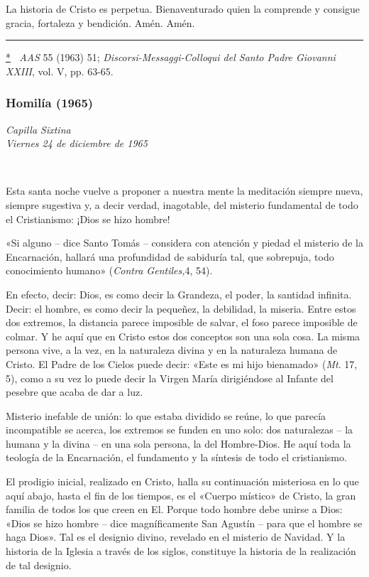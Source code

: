 La historia de Cristo es perpetua. Bienaventurado quien la comprende y
consigue gracia, fortaleza y bendición. Amén. Amén.

\begin{center}\rule{0.5\linewidth}{\linethickness}\end{center}

\protect\hyperlink{_ednrefux2a}{*}\emph{~ AAS} 55 (1963) 51;
\emph{Discorsi-Messaggi-Colloqui del Santo Padre Giovanni XXIII}, vol.
V, pp. 63-65.

\subsubsection{Homilía (1965)}
\emph{Capilla Sixtina\\
	Viernes 24 de diciembre de 1965}

~

Esta santa noche vuelve a proponer a nuestra mente la meditación siempre
nueva, siempre sugestiva y, a decir verdad, inagotable, del misterio
fundamental de todo el Cristianismo: ¡Dios se hizo hombre!

«Si alguno -- dice Santo Tomás -- considera con atención y piedad el
misterio de la Encarnación, hallará una profundidad de sabiduría tal,
que sobrepuja, todo conocimiento humano» (\emph{Contra Gentiles,}4, 54).

En efecto, decir: Dios, es como decir la Grandeza, el poder, la santidad
infinita. Decir: el hombre, es como decir la pequeñez, la debilidad, la
miseria. Entre estos dos extremos, la distancia parece imposible de
salvar, el foso parece imposible de colmar. Y he aquí que en Cristo
estos dos conceptos son una sola cosa. La misma persona vive, a la vez,
en la naturaleza divina y en la naturaleza humana de Cristo. El Padre de
los Cielos puede decir: «Este es mi hijo bienamado» (\emph{Mt}. 17, 5),
como a su vez lo puede decir la Virgen María dirigiéndose al Infante del
pesebre que acaba de dar a luz.

Misterio inefable de unión: lo que estaba dividido se reúne, lo que
parecía incompatible se acerca, los extremos se funden en uno solo: dos
naturalezas -- la humana y la divina -- en una sola persona, la del
Hombre-Dios. He aquí toda la teología de la Encarnación, el fundamento y
la síntesis de todo el cristianismo.

El prodigio inicial, realizado en Cristo, halla su continuación
misteriosa en lo que aquí abajo, hasta el fin de los tiempos, es el
«Cuerpo místico» de Cristo, la gran familia de todos los que creen en
El. Porque todo hombre debe unirse a Dios: «Dios se hizo hombre -- dice
magníficamente San Agustín -- para que el hombre se haga Dios». Tal es
el designio divino, revelado en el misterio de Navidad. Y la historia de
la Iglesia a través de los siglos, constituye la historia de la
realización de tal designio.

